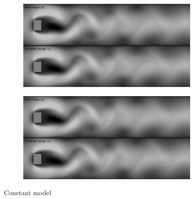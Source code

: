 \documentclass{llncs}
\begin{document}
\begin{figure}

  \begin{subfigure}{.5\textwidth}
    \centering
    \includegraphics[width=1\linewidth]{imgs/single_constant_x}
  \end{subfigure}
  \begin{subfigure}{.5\textwidth}
    \centering
    \includegraphics[width=1\linewidth]{imgs/single_constant_y}
  \end{subfigure}
  \begin{center}
    Constant model
  \end{center}


\end{figure}
\end{document}
